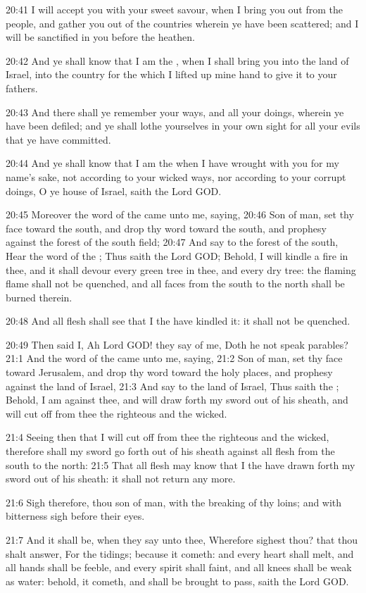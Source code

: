 20:41 I will accept you with your sweet savour, when I bring you out
from the people, and gather you out of the countries wherein ye have
been scattered; and I will be sanctified in you before the heathen.

20:42 And ye shall know that I am the \LORD, when I shall bring you
into the land of Israel, into the country for the which I lifted up
mine hand to give it to your fathers.

20:43 And there shall ye remember your ways, and all your doings,
wherein ye have been defiled; and ye shall lothe yourselves in your
own sight for all your evils that ye have committed.

20:44 And ye shall know that I am the \LORD when I have wrought with
you for my name's sake, not according to your wicked ways, nor
according to your corrupt doings, O ye house of Israel, saith the Lord
GOD.

20:45 Moreover the word of the \LORD came unto me, saying, 20:46 Son of
man, set thy face toward the south, and drop thy word toward the
south, and prophesy against the forest of the south field; 20:47 And
say to the forest of the south, Hear the word of the \LORD; Thus saith
the Lord GOD; Behold, I will kindle a fire in thee, and it shall
devour every green tree in thee, and every dry tree: the flaming flame
shall not be quenched, and all faces from the south to the north shall
be burned therein.

20:48 And all flesh shall see that I the \LORD have kindled it: it
shall not be quenched.

20:49 Then said I, Ah Lord GOD! they say of me, Doth he not speak
parables?  21:1 And the word of the \LORD came unto me, saying, 21:2
Son of man, set thy face toward Jerusalem, and drop thy word toward
the holy places, and prophesy against the land of Israel, 21:3 And say
to the land of Israel, Thus saith the \LORD; Behold, I am against thee,
and will draw forth my sword out of his sheath, and will cut off from
thee the righteous and the wicked.

21:4 Seeing then that I will cut off from thee the righteous and the
wicked, therefore shall my sword go forth out of his sheath against
all flesh from the south to the north: 21:5 That all flesh may know
that I the \LORD have drawn forth my sword out of his sheath: it shall
not return any more.

21:6 Sigh therefore, thou son of man, with the breaking of thy loins;
and with bitterness sigh before their eyes.

21:7 And it shall be, when they say unto thee, Wherefore sighest thou?
that thou shalt answer, For the tidings; because it cometh: and every
heart shall melt, and all hands shall be feeble, and every spirit
shall faint, and all knees shall be weak as water: behold, it cometh,
and shall be brought to pass, saith the Lord GOD.

